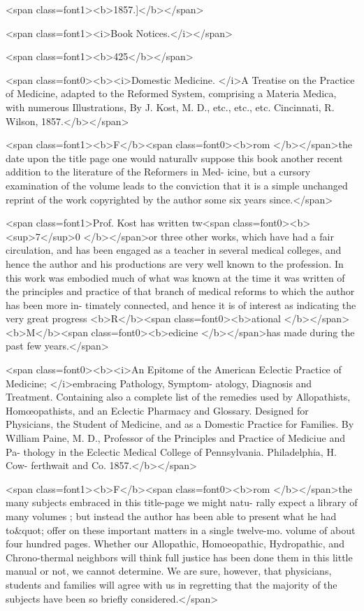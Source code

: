 <span class=font1><b>1857.]</b></span>

<span class=font1><i>Book Notices.</i></span>

<span class=font1><b>425</b></span>

<span class=font0><b><i>Domestic Medicine. </i>A Treatise on the Practice of Medicine, adapted to the Reformed
System, comprising a Materia Medica, with numerous Illustrations, By J. Kost, M. D.,
etc., etc., etc.   Cincinnati, R. Wilson, 1857.</b></span>

<span class=font1><b>F</b><span class=font0><b>rom </b></span>the date upon the title page one would naturallv suppose this
book another recent addition to the literature of the Reformers in Med-
icine, but a cursory examination of the volume leads to the conviction
that it is a simple unchanged reprint of the work copyrighted by the
author some six years since.</span>

<span class=font1>Prof. Kost has written tw<span class=font0><b><sup>7</sup>0 </b></span>or three other works, which have had
a fair circulation, and has been engaged as a teacher in several
medical colleges, and hence the author and his productions are very
well known to the profession. In this work was embodied much of what
was known at the time it was written of the principles and practice of
that branch of medical reforms to which the author has been more in-
timately connected, and hence it is of interest as indicating the very
great progress <b>R</b><span class=font0><b>ational </b></span><b>M</b><span class=font0><b>edicine </b></span>has made during the past few years.</span>

<span class=font0><b><i>An Epitome of the American Eclectic Practice of Medicine; </i>embracing Pathology, Symptom-
atology, Diagnosis and Treatment. Containing also a complete list of the remedies used
by Allopathists, Homœopathists, and an Eclectic Pharmacy and Glossary. Designed
for Physicians, the Student of Medicine, and as a Domestic Practice for Families. By
William Paine, M. D., Professor of the Principles and Practice of Mediciue and Pa-
thology in the Eclectic Medical College of Pennsylvania. Philadelphia, H. Cow-
ferthwait and Co. 1857.</b></span>

<span class=font1><b>F</b><span class=font0><b>rom </b></span>the many subjects embraced in this title-page we might natu-
rally expect a library of many volumes ; but instead the author has been
able to present what he had to&quot; offer on these important matters in a
single twelve-mo. volume of about four hundred pages. Whether our
Allopathic, Homoeopathic, Hydropathic, and Chrono-thermal neighbors
will think full justice has been done them in this little manual or not,
we cannot determine. We are sure, however, that physicians, students
and families will agree with us in regretting that the majority of the
subjects have been so briefly considered.</span>

